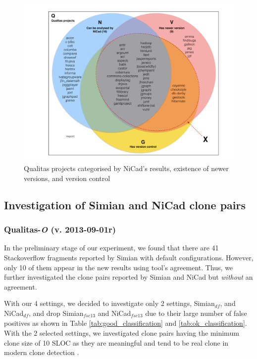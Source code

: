 \documentclass{IEEEtran}
\begin{document}
\begin{figure}
	\centering
	\includegraphics[width=0.7\linewidth]{n+v+g}
	\caption{Qualitas projects categorised by NiCad's results, existence of newer versions, and version control}
	\label{fig:n+v+g}
\end{figure}

\subsection{Investigation of Simian and NiCad clone pairs}
\subsubsection{Qualitas-\textit{O} (v. 2013-09-01r)}
In the preliminary stage of our experiment, we found that there are 41 Stackoverflow fragments reported by Simian with default configurations. However, only 10 of them appear in the new results using tool's agreement. Thus, we further investigated the clone pairs reported by Simian and NiCad but \textit{without} an agreement. 

With our 4 settings, we decided to investigate only 2 settings, Simian$_{df}$, and NiCad$_{df}$, and drop Simian$_{\mathrm{\textit{fse13}}}$ and NiCad$_{\mathrm{\textit{fse13}}}$ due to their large number of false positives as shown in Table \ref{tab:good_classification} and \ref{tab:ok_classification}. With the 2 selected settings, we investigated clone pairs having the minimum clone size of 10 SLOC as they are meaningful and tend to be real clone in modern clone detection \cite{Sajnani2016}. 
\end{document}
